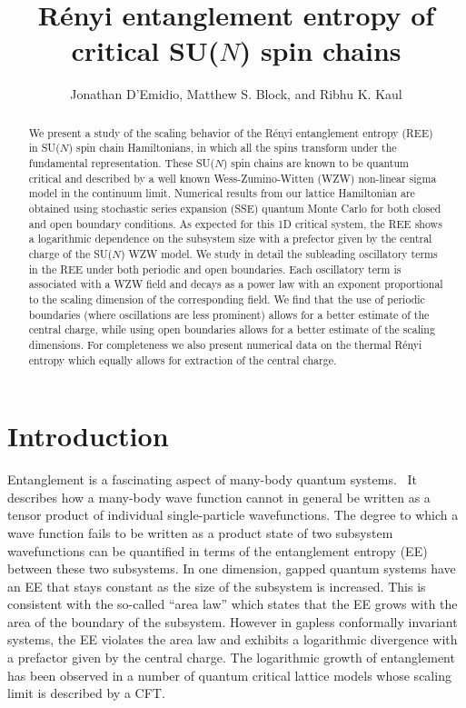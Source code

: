 \documentclass[aps,prb,reprint,floatfix]{revtex4-1}
\begin{document}
\title{R\'{e}nyi entanglement entropy of critical SU($N$) spin chains}
\author{Jonathan D'Emidio, Matthew S. Block, and Ribhu K. Kaul}
\begin{abstract}

We present a study of the scaling behavior of the R\'{e}nyi entanglement entropy (REE) in SU($N$) spin chain Hamiltonians, in which all the spins transform under the fundamental representation. These SU($N$) spin chains are known to be quantum critical and described by a well known Wess-Zumino-Witten (WZW) non-linear sigma model in the continuum limit.  Numerical results from our lattice Hamiltonian are obtained using  stochastic series expansion (SSE) quantum Monte Carlo for both closed and open boundary conditions. As expected for this 1D critical system, the REE shows a logarithmic dependence on the subsystem size with a prefector given by the central charge of the SU($N$) WZW model.  We study in detail the subleading oscillatory terms in the REE under both periodic and open boundaries.  Each oscillatory term is associated with a WZW field and decays as a power law with an exponent proportional to the scaling dimension of the corresponding field.  We find that the use of periodic boundaries (where oscillations are less prominent) allows for a better estimate of the central charge, while using open boundaries allows for a better estimate of the scaling dimensions.  For completeness we also present numerical data on the thermal R\'{e}nyi entropy which equally allows for extraction of the central charge.


\end{abstract}
\setlength{\belowcaptionskip}{-8pt}
\maketitle
\section{Introduction}  

Entanglement is a fascinating aspect of many-body quantum systems.~\cite{Amico2008:Entanglement}  It describes how a many-body wave function cannot in general be written as a tensor product of individual single-particle wavefunctions.  The degree to which a wave function fails to be written as a product state of two subsystem wavefunctions can be quantified in terms of the entanglement entropy (EE) between these two subsystems. In one dimension, gapped quantum systems have an EE that stays constant as the size of the subsystem is increased. This is consistent with the so-called ``area law'' which states that the EE grows with the area of the boundary of the subsystem.\cite{Eisert2010:AreaLaws} However in gapless conformally invariant systems, the EE violates the area law and exhibits a logarithmic divergence with a prefactor given by the central charge. \cite{Holzhey1994:GeometricEntropyCFT,Calabrese2004:EEandQFT,Korepin2004:thermal} The logarithmic growth of entanglement has been observed in a number of quantum critical lattice models whose scaling limit is described by a CFT.  
\end{document}
